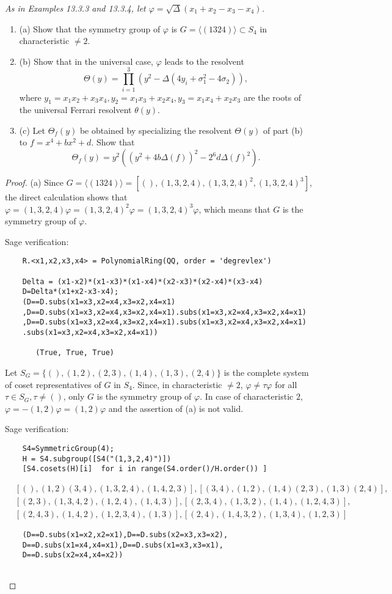 \documentclass[11pt,a4paper]{article}
\newcommand{\be} {\begin{enumerate}}
\newcommand{\ee} {\end{enumerate}}
\begin{document}
{\it As in Examples 13.3.3 and 13.3.4, let $\varphi=\sqrt{\Delta}(x_1+x_2-x_3-x_4)$.
\be
\item[(a)] Show that the symmetry group of $\varphi$ is $G=\langle(1324)\rangle\subset S_4$ in characteristic $\ne 2$.
\item[(b)] Show that in the universal case, $\varphi$ leads to the resolvent $$\Theta(y)=\prod_{i=1}^3 ( y^2 - \Delta(4y_i+\sigma_1^2-4\sigma_2)) ,$$ where $y_1=x_1x_2+x_3x_4,y_2=x_1x_3+x_2x_4,y_3=x_1x_4+x_2x_3$ are the roots of the universal Ferrari resolvent $\theta(y)$.
\item[(c)] Let $\Theta_f (y)$ be obtained by specializing the resolvent $\Theta (y)$ of part (b) to $f=x^4+bx^2+d$. Show that $$\Theta_f (y)=y^2((y^2+4b\Delta(f))^2-2^6 d\Delta(f)^2). $$
\ee
\begin{proof}
\item[(a)] Since $G=\langle(1324)\rangle=[(), (1,3,2,4), (1,3,2,4)^2, (1,3,2,4)^3]$, the direct calculation shows that $\varphi=(1,3,2,4)\varphi=(1,3,2,4)^2\varphi= (1,3,2,4)^3\varphi$, which means that $G$ is the symmetry group of $\varphi$.

Sage verification:
\begin{verbatim}
    R.<x1,x2,x3,x4> = PolynomialRing(QQ, order = 'degrevlex')

    Delta = (x1-x2)*(x1-x3)*(x1-x4)*(x2-x3)*(x2-x4)*(x3-x4)
    D=Delta*(x1+x2-x3-x4);
    (D==D.subs(x1=x3,x2=x4,x3=x2,x4=x1)
    ,D==D.subs(x1=x3,x2=x4,x3=x2,x4=x1).subs(x1=x3,x2=x4,x3=x2,x4=x1)
    ,D==D.subs(x1=x3,x2=x4,x3=x2,x4=x1).subs(x1=x3,x2=x4,x3=x2,x4=x1)
    .subs(x1=x3,x2=x4,x3=x2,x4=x1))
    
       (True, True, True)
\end{verbatim}

Let $S_G=\{(),(1,2),(2,3),(1,4),(1,3),(2,4)\}$ is the complete system of coset representatives of $G$ in $S_4$. Since, in characteristic $\ne 2$, $\varphi \ne \tau \varphi$ for all $\tau \in S_G, \tau\ne ()$, only $G$ is the symmetry group of $\varphi$. In case of characteristic $2$, $\varphi = -(1,2) \varphi= (1,2) \varphi$ and the assertion of (a) is not valid.

Sage verification:
\begin{verbatim}
    S4=SymmetricGroup(4);
    H = S4.subgroup([S4("(1,3,2,4)")])
    [S4.cosets(H)[i]  for i in range(S4.order()/H.order()) ]
\end{verbatim}
\begin{align*}
&[(), (1,2)(3,4), (1,3,2,4), (1,4,2,3)], [(3,4), (1,2), (1,4)(2,3), (1,3)(2,4)],\\
& [(2,3), (1,3,4,2), (1,2,4), (1,4,3)], [(2,3,4), (1,3,2), (1,4), (1,2,4,3)],\\
& [(2,4,3), (1,4,2), (1,2,3,4), (1,3)], [(2,4), (1,4,3,2), (1,3,4), (1,2,3)]
\end{align*}
\begin{verbatim}
    (D==D.subs(x1=x2,x2=x1),D==D.subs(x2=x3,x3=x2),
    D==D.subs(x1=x4,x4=x1),D==D.subs(x1=x3,x3=x1),
    D==D.subs(x2=x4,x4=x2))


\end{verbatim}
\end{proof}}
\end{document}
